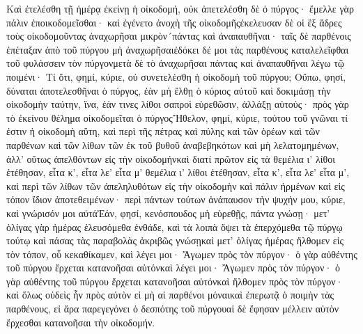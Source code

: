 Καὶ ἐτελέσθη τῇ ἡμέρᾳ ἐκείνῃ ἡ οἰκοδομή, οὐκ ἀπετελέσθη δὲ ὁ πύργος· ἔμελλε γὰρ πάλιν ἐποικοδομεῖσθαι· καὶ ἐγένετο ἀνοχὴ τῆς οἰκοδομῆςἐκελευσαν δὲ οἱ ἓξ ἄδρες τοὺς οἰκοδομοῦντας ἀναχωρῆσαι μικρὸν´πάντας καὶ ἀναπαυθῆναι· ταῖς δὲ παρθένοις ἐπέταξαν ἀπὸ τοῦ πύργου μὴ ἀναχωρῆσαιἐδόκει δέ μοι τὰς παρθένους καταλελεῖφθαι τοῦ φυλάσσειν τὸν πύργονμετὰ δὲ τὸ ἀναχωρῆσαι πάντας καὶ ἀναπαυθῆναι λέγω τῷ ποιμένι· Τί ὅτι, φημί, κύριε, οὐ συνετελέσθη ἡ οἰκοδομὴ τοῦ πύργου; Οὔπω, φησί, δύναται ἀποτελεσθῆναι ὁ πύργος, ἐὰν μὴ ἔλθῃ ὁ κύριος αὐτοῦ καὶ δοκιμάσῃ τὴν οἰκοδομὴν ταύτην, ἵνα, ἐάν τινες λίθοι σαπροὶ εὑρεθῶσιν, ἀλλάξῃ αὐτούς· πρὸς γὰρ τὸ ἐκείνου θέλημα οἰκοδομεῖται ὁ πύργοςἬθελον, φημί, κύριε, τούτου τοῦ γνῶναι τί ἐστιν ἡ οἰκοδομὴ αὕτη, καὶ περὶ τῆς πέτρας καὶ πύλης καὶ τῶν ὀρέων καὶ τῶν παρθένων καὶ τῶν λίθων τῶν ἐκ τοῦ βυθοῦ ἀναβεβηκότων καὶ μὴ λελατομημένων, ἀλλ’ οὕτως ἀπελθόντων εἰς τὴν οἰκοδομήνκαὶ διατί πρῶτον εἰς τὰ θεμέλια ι’ λίθοι ἐτέθησαν, εἶτα κ’, εἶτα λε’ εἶτα μ’ θεμέλια ι’ λίθοι ἐτέθησαν, εἶτα κ’, εἶτα λε’ εἶτα μ’, καὶ περὶ τῶν λίθων τῶν ἀπεληλυθότων εἰς τὴν οἰκοδομὴν καὶ πάλιν ἠρμένων καὶ εἰς τόπον ἴδιον ἀποτεθειμένων· περὶ πάντων τούτων ἀνάπαυσον τὴν ψυχήν μου, κύριε, καὶ γνώρισόν μοι αὐτάἘάν, φησί, κενόσπουδος μὴ εὑρεθῇς, πάντα γνώσῃ· μετ’ ὀλίγας γὰρ ἡμέρας ἐλευσόμεθα ἐνθάδε, καὶ τὰ λοιπὰ ὄψει τὰ ἐπερχόμεθα τῷ πύργῳ τούτῳ καὶ πάσας τὰς παραβολὰς ἀκριβῶς γνώσῃκαὶ μετ’ ὀλίγας ἡμέρας ἤλθομεν εἰς τὸν τόπον, οὗ κεκαθίκαμεν, καὶ λέγει μοι· Ἄγωμεν πρὸς τὸν πύργον· ὁ γὰρ αὐθέντης τοῦ πύργου ἔρχεται κατανοῆσαι αὐτόνκαὶ λέγει μοι· Ἄγωμεν πρὸς τὸν πύργον· ὁ γὰρ αὐθέντης τοῦ πύργου ἔρχεται κατανοῆσαι αὐτόνκαὶ ἤλθομεν πρὸς τὸν πύργον· καὶ ὅλως οὐδεὶς ἧν πρὸς αὐτὸν εἰ μὴ αἱ παρθένοι μόναικαὶ ἐπερωτᾷ ὁ ποιμὴν τὰς παρθένους, εἰ ἄρα παρεγεγόνει ὁ δεσπότης τοῦ πύργουαἱ δὲ ἔφησαν μέλλειν αὐτὸν ἔρχεσθαι κατανοῆσαι τὴν οἰκοδομήν.
